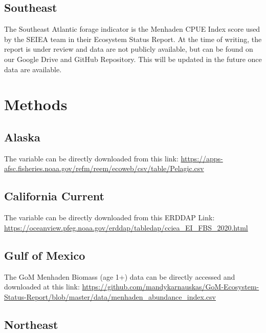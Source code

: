 \documentclass[
]{book}
\begin{document}
\hypertarget{southeast}{%
\subsection{Southeast}\label{southeast}}

The Southeast Atlantic forage indicator is the Menhaden CPUE Index score used by the SEIEA team in their Ecosystem Status Report. At the time of writing, the report is under review and data are not publicly available, but can be found on our Google Drive and GitHub Repository. This will be updated in the future once data are available.

\hypertarget{methods-2}{%
\section{Methods}\label{methods-2}}

\hypertarget{alaska-1}{%
\subsection{Alaska}\label{alaska-1}}

The variable can be directly downloaded from this link: \url{https://apps-afsc.fisheries.noaa.gov/refm/reem/ecoweb/csv/table/Pelagic.csv}

\hypertarget{california-current-1}{%
\subsection{California Current}\label{california-current-1}}

The variable can be directly downloaded from this ERDDAP Link: \url{https://oceanview.pfeg.noaa.gov/erddap/tabledap/cciea_EI_FBS_2020.html}

\hypertarget{gulf-of-mexico-1}{%
\subsection{Gulf of Mexico}\label{gulf-of-mexico-1}}

The GoM Menhaden Biomass (age 1+) data can be directly accessed and downloaded at this link: \url{https://github.com/mandykarnauskas/GoM-Ecosystem-Status-Report/blob/master/data/menhaden_abundance_index.csv}

\hypertarget{northeast-1}{%
\subsection{Northeast}\label{northeast-1}}
\end{document}
